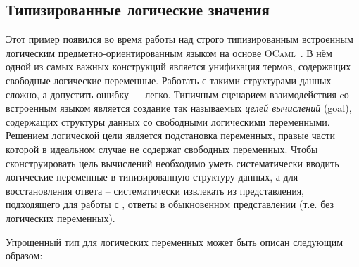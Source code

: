 




\subsection{Типизированные логические значения}
\label{sec:lists}

Этот пример появился во время работы над строго типизированным встроенным логическим предметно-ориентированным языком на основе \textsc{OCaml}~\cite{OCanren}. 
В нём одной из самых важных конструкций является унификация термов, содержащих свободные логические переменные. Работать с такими структурами данных сложно, а допустить ошибку --- легко. 
Типичным сценарием взаимодействия  
cо встроенным языком 
является 
создание так называемых \emph{целей вычислений} (goal), содержащих структуры данных со свободными логическими переменными.
Решением логической цели является подстановка переменных, правые части которой в идеальном случае не содержат свободных переменных. 
Чтобы сконструировать цель вычислений необходимо уметь систематически вводить логические переменные в типизированную структуру данных,  а для восстановления ответа -- систематически извлекать из представления, подходящего для работы с \OCanren{}, ответы в обыкновенном
представлении (т.е. без логических переменных).

Упрощенный тип для логических переменных может быть описан следующим образом:

